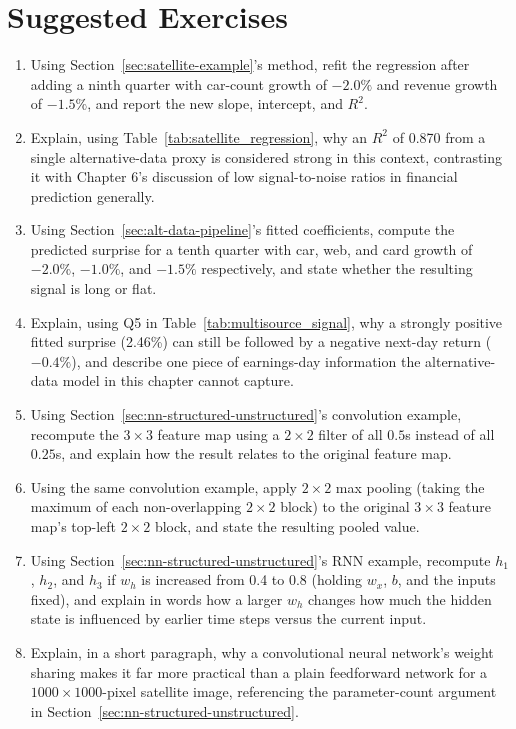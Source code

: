 \documentclass[../ai_in_finance]{subfiles}
\begin{document}
\section{Suggested Exercises}

\begin{enumerate}
    \item Using Section~\ref{sec:satellite-example}'s method, refit the regression after adding a ninth quarter with car-count growth of $-2.0\%$ and revenue growth of $-1.5\%$, and report the new slope, intercept, and $R^2$.
    \item Explain, using Table~\ref{tab:satellite_regression}, why an $R^2$ of 0.870 from a single alternative-data proxy is considered strong in this context, contrasting it with Chapter 6's discussion of low signal-to-noise ratios in financial prediction generally.
    \item Using Section~\ref{sec:alt-data-pipeline}'s fitted coefficients, compute the predicted surprise for a tenth quarter with car, web, and card growth of $-2.0\%$, $-1.0\%$, and $-1.5\%$ respectively, and state whether the resulting signal is long or flat.
    \item Explain, using Q5 in Table~\ref{tab:multisource_signal}, why a strongly positive fitted surprise (2.46\%) can still be followed by a negative next-day return ($-0.4\%$), and describe one piece of earnings-day information the alternative-data model in this chapter cannot capture.
    \item Using Section~\ref{sec:nn-structured-unstructured}'s convolution example, recompute the $3\times3$ feature map using a $2\times2$ filter of all $0.5$s instead of all $0.25$s, and explain how the result relates to the original feature map.
    \item Using the same convolution example, apply $2\times2$ max pooling (taking the maximum of each non-overlapping $2\times2$ block) to the original $3\times3$ feature map's top-left $2\times2$ block, and state the resulting pooled value.
    \item Using Section~\ref{sec:nn-structured-unstructured}'s RNN example, recompute $h_1$, $h_2$, and $h_3$ if $w_h$ is increased from 0.4 to 0.8 (holding $w_x$, $b$, and the inputs fixed), and explain in words how a larger $w_h$ changes how much the hidden state is influenced by earlier time steps versus the current input.
    \item Explain, in a short paragraph, why a convolutional neural network's weight sharing makes it far more practical than a plain feedforward network for a $1000\times1000$-pixel satellite image, referencing the parameter-count argument in Section~\ref{sec:nn-structured-unstructured}.

\end{enumerate}
\end{document}
